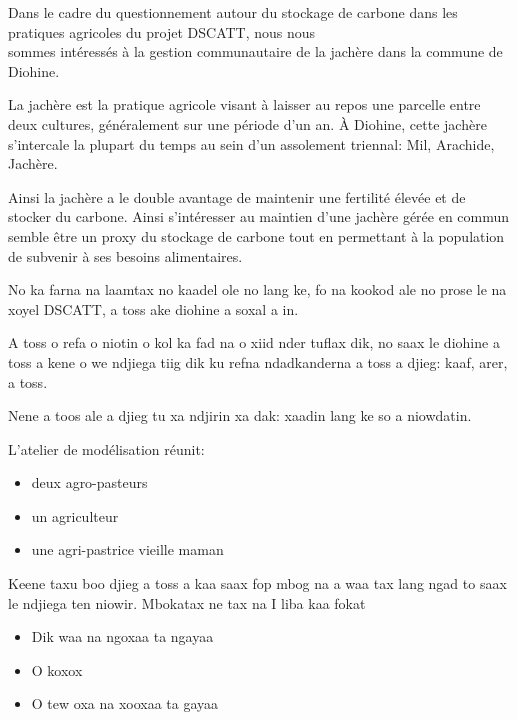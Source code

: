 \begin{paracol}{2}
  Dans le cadre du questionnement autour du stockage de carbone dans les pratiques agricoles du projet DSCATT, nous nous \\
  sommes intéressés à la gestion communautaire de la jachère dans la commune de Diohine.

  La jachère est la pratique agricole visant à laisser au repos une parcelle entre deux cultures, généralement sur une période d'un an. À Diohine, cette jachère s'intercale la plupart du temps au sein d'un assolement triennal: Mil, Arachide, Jachère.

  Ainsi la jachère a le double avantage de maintenir une fertilité élevée et de stocker du carbone. Ainsi s'intéresser au maintien d'une jachère gérée en commun semble être un proxy du stockage de carbone tout en permettant à la population de subvenir à ses besoins alimentaires.

  \switchcolumn %

  No ka farna na laamtax no kaadel ole no lang ke, fo na kookod ale no prose le na xoyel DSCATT, a toss ake diohine a soxal a in.

  A toss o refa o niotin o kol ka fad na o xiid nder tuflax dik, no saax le diohine a toss a kene o we ndjiega tiig dik ku refna ndadkanderna a toss a djieg: kaaf, arer, a toss.

  Nene a toos ale a djieg tu xa ndjirin xa dak: xaadin lang ke so a niowdatin.

  \switchcolumn %
  L'atelier de modélisation réunit:
  \begin{itemize}
    \item deux agro-pasteurs
    \item un agriculteur
    \item une agri-pastrice vieille maman
  \end{itemize}

  \switchcolumn %

  Keene taxu boo djieg a toss a kaa saax fop mbog na a waa tax lang ngad to saax le ndjiega ten niowir. Mbokatax ne tax na I liba kaa fokat
  \begin{itemize}
    \item Dik waa na ngoxaa ta ngayaa
    \item O koxox
    \item O tew oxa na xooxaa ta gayaa
  \end{itemize}

  \switchcolumn %


\end{paracol}
